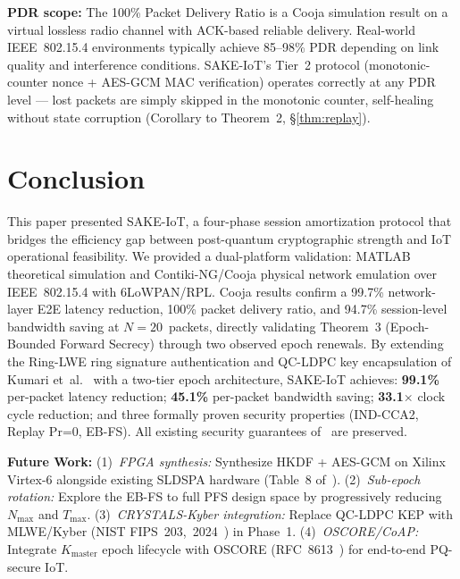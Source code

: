\documentclass[conference]{IEEEtran}
\newcommand{\Kmaster}{K_{\mathrm{master}}}
\newcommand{\Nmax}{N_{\max}}
\newcommand{\Tmax}{T_{\max}}
\begin{document}
\noindent\textbf{PDR scope:} The 100\% Packet Delivery Ratio is a
Cooja simulation result on a virtual lossless radio channel with
ACK-based reliable delivery. Real-world IEEE~802.15.4 environments
typically achieve 85--98\% PDR depending on link quality and
interference conditions. SAKE-IoT's Tier~2 protocol
(monotonic-counter nonce + AES-GCM MAC verification) operates
correctly at any PDR level --- lost packets are simply skipped in
the monotonic counter, self-healing without state corruption
(Corollary to Theorem~2, \S\ref{thm:replay}).
\section{Conclusion}
\label{sec:conclusion}

This paper presented SAKE-IoT, a four-phase session amortization protocol
that bridges the efficiency gap between post-quantum cryptographic strength
and IoT operational feasibility. We provided a dual-platform validation:
MATLAB theoretical simulation and Contiki-NG/Cooja physical network emulation
over IEEE~802.15.4 with 6LoWPAN/RPL. Cooja results confirm a 99.7\%
network-layer E2E latency reduction, 100\% packet delivery ratio, and 94.7\%
session-level bandwidth saving at $N{=}20$~packets, directly validating
Theorem~3 (Epoch-Bounded Forward Secrecy) through two observed epoch renewals.
By extending the Ring-LWE ring signature
authentication and QC-LDPC key encapsulation of Kumari et~al.~\cite{kumari2022}
with a two-tier epoch architecture, SAKE-IoT achieves: \textbf{99.1\%}
per-packet latency reduction; \textbf{45.1\%} per-packet bandwidth saving;
\textbf{33.1$\times$} clock cycle reduction; and three formally proven
security properties (IND-CCA2, Replay Pr=0, EB-FS). All existing security
guarantees of~\cite{kumari2022} are preserved.


\noindent\textbf{Future Work:}
(1)~\textit{FPGA synthesis:} Synthesize HKDF + AES-GCM on Xilinx Virtex-6
alongside existing SLDSPA hardware (Table~8 of~\cite{kumari2022}).
(2)~\textit{Sub-epoch rotation:} Explore the EB-FS to full PFS design
space by progressively reducing $\Nmax$ and $\Tmax$.
(3)~\textit{CRYSTALS-Kyber integration:} Replace QC-LDPC KEP with
MLWE/Kyber (NIST FIPS~203,~2024~\cite{fips203}) in Phase~1.
(4)~\textit{OSCORE/CoAP:} Integrate $\Kmaster$ epoch lifecycle with
OSCORE (RFC~8613~\cite{rfc8613}) for end-to-end PQ-secure IoT.


\end{document}
